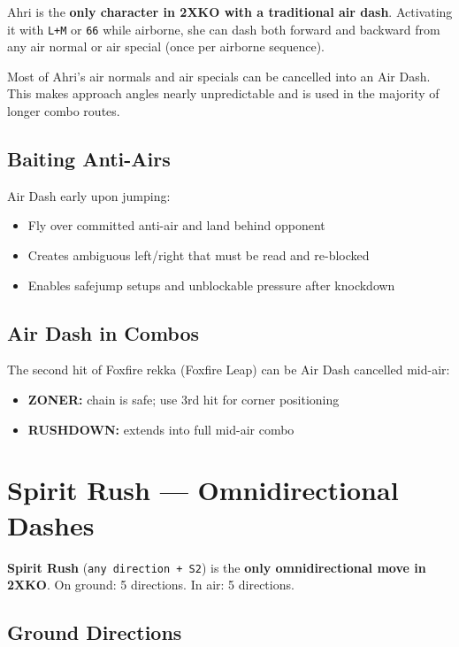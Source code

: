 \documentclass[12pt, a4paper]{report}
\newcommand{\notation}[1]{{\small\texttt{\textcolor{ahriCyan}{#1}}}}
\newcommand{\movename}[1]{\textbf{\textcolor{ahriGold}{#1}}}
\newcommand{\zoner}{\textcolor{ahriCyan}{\bfseries\sffamily{\small $\blacktriangleright$} ZONER:}\;}
\newcommand{\rushdown}{\textcolor{ahriMagenta}{\bfseries\sffamily{\small $\blacktriangleright$} RUSHDOWN:}\;}
\begin{document}
Ahri is the \textbf{only character in 2XKO with a traditional air dash}. Activating it with \notation{L+M} or \notation{66} while airborne, she can dash both forward and backward from any air normal or air special (once per airborne sequence).

\begin{tipbox}
Most of Ahri's air normals and air specials can be cancelled into an Air Dash. This makes approach angles nearly unpredictable and is used in the majority of longer combo routes.
\end{tipbox}

\subsection{Baiting Anti-Airs}

Air Dash early upon jumping:
\begin{itemize}
  \item Fly over committed anti-air and land behind opponent
  \item Creates ambiguous left/right that must be read and re-blocked
  \item Enables safejump setups and unblockable pressure after knockdown
\end{itemize}

\subsection{Air Dash in Combos}

The second hit of Foxfire rekka (Foxfire Leap) can be Air Dash cancelled mid-air:
\begin{itemize}
  \item \zoner \notation{S1 > S1 > S1} chain is safe; use 3rd hit for corner positioning
  \item \rushdown \notation{S1 > S1 > AD > j.M > j.H} extends into full mid-air combo
\end{itemize}

\section{Spirit Rush --- Omnidirectional Dashes}

\movename{Spirit Rush} (\notation{any direction + S2}) is the \textbf{only omnidirectional move in 2XKO}. On ground: 5 directions. In air: 5 directions.

\subsection{Ground Directions}
\end{document}
